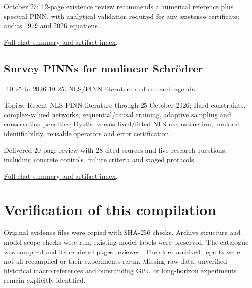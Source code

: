 \documentclass[11pt]{article}
\begin{document}
\noindent October 23: 12-page existence review recommends a numerical reference plus spectral PINN, with analytical validation required for any existence certificate; audits 1979 and 2026 equations.

\nopagebreak[4]
\noindent\href{https://github.com/matasvai/dysthe-research-map/blob/codex/research-record-2026-11-05/research-record/2026-11-05/CHATS.md#chat-01a169f9-4540-73a2-b24d-45199d4a30b0}{Full chat summary and artifact index}.
\subsection*{Survey PINNs for nonlinear Schröd{\cyrillicfont г}er}
-10-25 to 2026-10-25. NLS/PINN literature and research agenda.\par
Topics: Recent NLS PINN literature through 25 October 2026; Hard constraints, complex-valued networks, sequential/causal training, adaptive sampling and conservation penalties; Dysthe versus fixed/fitted NLS reconstruction, nonlocal identifiability, reusable operators and error certification.

\noindent Delivered 20-page review with 28 cited sources and five research questions, including concrete controls, failure criteria and staged protocols.

\nopagebreak[4]
\noindent\href{https://github.com/matasvai/dysthe-research-map/blob/codex/research-record-2026-11-05/research-record/2026-11-05/CHATS.md#chat-01a175cb-e630-7523-b755-574f5ff72f3b}{Full chat summary and artifact index}.

\section{Verification of this compilation}
Original evidence files were copied with SHA-256 checks. Archive structure and model-scope checks were run; existing model labels were preserved. The catalogue was compiled and its rendered pages reviewed. The older archived reports were not all recompiled or their experiments rerun. Missing raw data, unverified historical macro references and outstanding GPU or long-horizon experiments remain explicitly identified.
\end{document}
